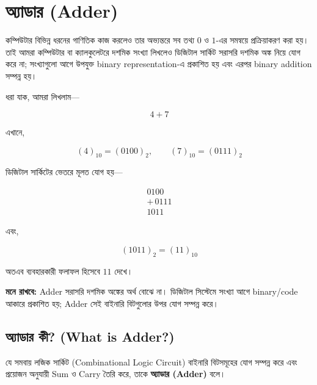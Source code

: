 
\section{অ্যাডার (\textenglish{Adder})}

কম্পিউটার বিভিন্ন ধরনের গাণিতিক কাজ করলেও তার অভ্যন্তরে সব তথ্য
\(0\) ও \(1\)-এর সমন্বয়ে প্রক্রিয়াকরণ করা হয়। তাই আমরা কম্পিউটার বা
ক্যালকুলেটরে দশমিক সংখ্যা লিখলেও ডিজিটাল সার্কিট সরাসরি দশমিক অঙ্ক নিয়ে
যোগ করে না; সংখ্যাগুলো আগে উপযুক্ত
\textenglish{binary representation}-এ প্রকাশিত হয় এবং এরপর
\textenglish{binary addition} সম্পন্ন হয়।

ধরা যাক, আমরা লিখলাম—

\[
4+7
\]

এখানে,

\[
(4)_{10}=(0100)_2,
\qquad
(7)_{10}=(0111)_2
\]

ডিজিটাল সার্কিটের ভেতরে মূলত যোগ হয়—

\[
\begin{array}{r}
0100\\[-1mm]
+\,0111\\
\hline
1011
\end{array}
\]

এবং,

\[
(1011)_2=(11)_{10}
\]

অতএব ব্যবহারকারী ফলাফল হিসেবে \(11\) দেখে।

\par\begingroup

\textbf{মনে রাখবে:}
\textenglish{Adder} সরাসরি দশমিক অঙ্কের অর্থ বোঝে না।
ডিজিটাল সিস্টেমে সংখ্যা আগে \textenglish{binary/code} আকারে প্রকাশিত হয়;
\textenglish{Adder} সেই বাইনারি বিটগুলোর উপর যোগ সম্পন্ন করে।
\par\endgroup




\subsection{অ্যাডার কী?
(\textenglish{What is Adder?})}

\par\begingroup

যে সমবায় লজিক সার্কিট
(\textenglish{Combinational Logic Circuit})
বাইনারি বিটসমূহের যোগ সম্পন্ন করে এবং প্রয়োজন অনুযায়ী
\textenglish{Sum} ও \textenglish{Carry} তৈরি করে, তাকে
\textbf{অ্যাডার (\textenglish{Adder})} বলে।
\par\endgroup



